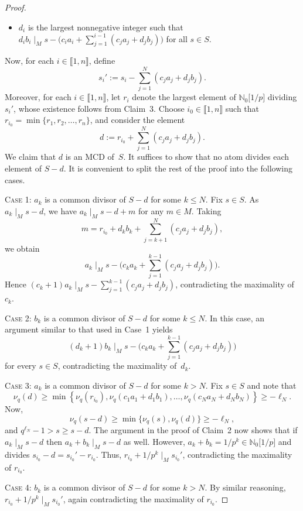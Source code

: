 \documentclass[10pt]{amsart}
\theoremstyle{definition}
\theoremstyle{remark}
\numberwithin{equation}{section}
\newcommand{\nn}{\mathbb{N}}
\providecommand\ldb{\llbracket}
\providecommand\rdb{\rrbracket}
\begin{document}
\begin{proof}
\begin{itemize}
    \item $d_i$ is the largest nonnegative integer such that $d_ib_i \mid_M s-\big(c_ia_i+\sum_{j=1}^{i-1}(c_ja_j+d_jb_j)\big)$ for all $s \in S$.
  \end{itemize}
  Now, for each $i \in \ldb 1,n \rdb$, define
  \[
    s_i' := s_i - \sum_{j=1}^N \left(c_ja_j+d_jb_j\right).
  \]
  Moreover, for each $i \in \ldb 1,n \rdb$, let $r_i$ denote the largest element of $\nn_0\big[1/p\big]$ dividing $s_i'$, whose existence follows from Claim~3. Choose $i_0 \in \ldb 1,n \rdb$ such that $r_{i_0}=\min\{r_1,r_2,\dots,r_n\}$, and consider the element
  \[
    d := r_{i_0}+\sum_{j=1}^N \left(c_ja_j+d_jb_j\right).
  \]
  We claim that $d$ is an MCD of~$S$. It suffices to show that no atom divides each element of $S-d$. It is convenient to split the rest of the proof into the following cases.
  \smallskip

  \textsc{Case 1:} $a_k$ is a common divisor of $S-d$ for some $k \le N$. Fix $s \in S$. As $a_k \mid_M s-d$, we have $a_k \mid_M s-d+m$ for any $m \in M$. Taking
  \[
    m = r_{i_0}+d_kb_k+\sum_{j=k+1}^N \left(c_ja_j+d_jb_j\right),
  \]
  we obtain
  \[
    a_k \mid_M s-\bigg( c_ka_k+\sum_{j=1}^{k-1}\left(c_ja_j+d_jb_j\right)\bigg).
  \]
  Hence $(c_k+1)a_k \mid_M s-\sum_{j=1}^{k-1}(c_ja_j+d_jb_j)$, contradicting the maximality of $c_k$.
  \smallskip

  \textsc{Case 2:} $b_k$ is a common divisor of $S-d$ for some $k \le N$. In this case, an argument similar to that used in Case~1 yields
  \[
    (d_k+1)b_k \mid_M s-\bigg(c_ka_k+\sum_{j=1}^{k-1}(c_ja_j+d_jb_j)\bigg)
  \]
  for every $s \in S$, contradicting the maximality of~$d_k$.
  \smallskip

  \textsc{Case 3:} $a_k$ is a common divisor of $S-d$ for some $k>N$. Fix $s \in S$ and note that
  \[
    \nu_q(d) \ge \min\left\{\nu_q(r_{i_0}),\nu_q(c_1a_1+d_1b_1),\dots,\nu_q(c_Na_N+d_Nb_N)\right\} \ge -\ell_N.
  \]
  Now,
  \[
    \nu_q(s-d) \ge \min\{\nu_q(s),\nu_q(d)\} \ge -\ell_N,
  \]
  and $q^{\ell_N}-1>s\ge s-d$. The argument in the proof of Claim~2 now shows that if $a_k \mid_M s-d$ then $a_k+b_k \mid_M s-d$ as well. However, $a_k+b_k=1/p^k \in \nn_0\big[1/p\big]$ and divides $s_{i_0}-d=s_{i_0}'-r_{i_0}$. Thus, $r_{i_0}+1/p^k \mid_M s_{i_0}'$, contradicting the maximality of $r_{i_0}$.
  \smallskip

  \textsc{Case 4:} $b_k$ is a common divisor of $S-d$ for some $k>N$. By similar reasoning, $r_{i_0}+1/p^k \mid_M s_{i_0}'$, again contradicting the maximality of $r_{i_0}$.
  \bigskip


\end{proof}
\end{document}
